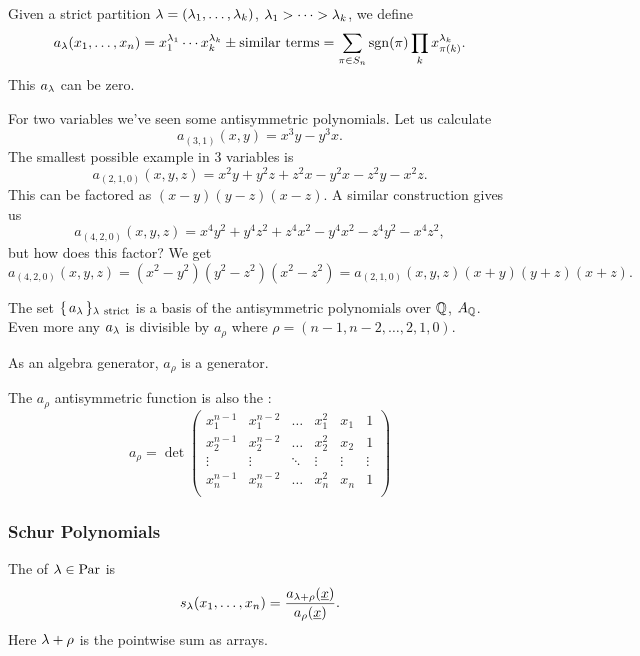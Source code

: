 \documentclass[12pt]{memoir}
\begin{document}
\begin{Def}
Given a strict partition $\lambda=(\lambda_1,\dots,\lambda_k)$, $\lambda_1>\dots>\lambda_k$, we define 
$$a_\lambda(x_1,\dots,x_n)=x_1^{\lambda_1}\cdots x_k^{\lambda_k}\pm\text{similar terms}=\sum_{\pi\in S_n}\operatorname{sgn}(\pi)\prod_{k}x_{\pi(k)}^{\lambda_k}.$$ 
This $a_\lambda$ can be zero. 
\end{Def}

\begin{Ex}
    For two variables we've seen some antisymmetric polynomials. Let us calculate 
    $$a_{(3,1)}(x,y)=x^3y-y^3x.$$
    The smallest possible example in 3 variables is 
    $$a_{(2,1,0)}(x,y,z)=x^2y+y^2z+z^2x-y^2x-z^2y-x^2z.$$
    This can be factored as $(x-y)(y-z)(x-z)$. A similar construction gives us
    $$a_{(4,2,0)}(x,y,z)=x^4y^2+y^4z^2+z^4x^2-y^4x^2-z^4y^2-x^4z^2,$$
    but how does this factor? We get 
    $$a_{(4,2,0)}(x,y,z)=(x^2-y^2)(y^2-z^2)(x^2-z^2)=a_{(2,1,0)}(x,y,z)(x+y)(y+z)(x+z).$$
\end{Ex}

\begin{Lem}
The set $\set{a_\la}_{\la\ \text{strict}}$ is a basis of the antisymmetric polynomials over $\mathbb{Q}$, $A_{\mathbb{Q}}$. Even more any $a_\lambda$ is divisible by $a_\rho$ where $\rho=(n-1,n-2,\dots,2,1,0)$. 
\end{Lem}

As an algebra generator, $a_\rho$ is a generator.
\begin{ptcbp}
\end{ptcbp}

\begin{Prop}
The $a_\rho$ antisymmetric function is also the : 
$$a_\rho=\det\begin{pmatrix}
    x_1^{n-1}&x_1^{n-2}&\dots&x_1^2&x_1&1\\
    x_2^{n-1}&x_2^{n-2}&\dots&x_2^2&x_2&1\\
    \vdots&\vdots&\ddots&\vdots&\vdots&\vdots\\
    x_n^{n-1}&x_n^{n-2}&\dots&x_n^2&x_n&1\\
\end{pmatrix}$$
\end{Prop}

\subsubsection{Schur Polynomials}

\begin{Def}
    The  of $\lambda\in\text{Par}$ is 
    $$s_\lambda(x_1,\dots,x_n)=\frac{a_{\lambda+\rho}(\underline{x})}{a_\rho(\underline x)}.$$
    Here $\lambda+\rho$ is the pointwise sum as arrays.
\end{Def}
\end{document}

